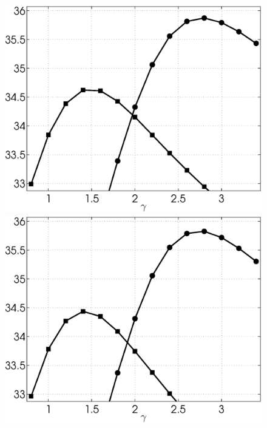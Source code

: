 \documentclass{ipol}
\begin{document}
\begin{figure}[ht!]
	\includegraphics[width=.33\textwidth]{f/nldct/HTH1ctn-vs-STH1ctn_bpsnr_np2-g-curves_1np040_s10_average.eps}%
	\includegraphics[width=.33\textwidth]{f/nldct/HTH1ctn-vs-STH1ctn_bpsnr_np2-g-curves_1np100_s10_average.eps}\\


\end{figure}
\end{document}
